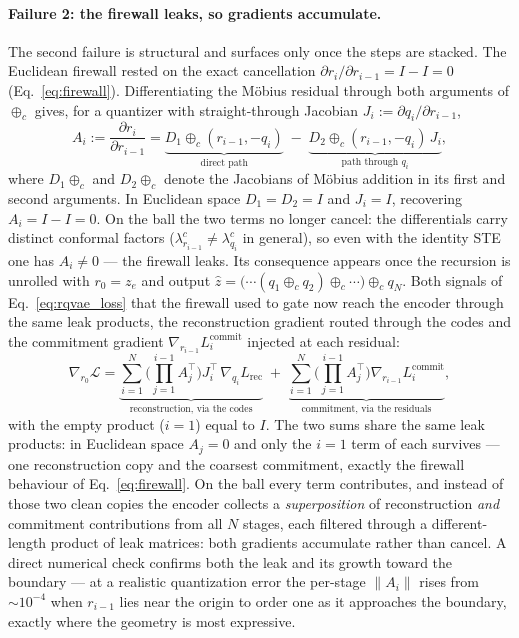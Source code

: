 \documentclass[12pt]{report}
\begin{document}
\paragraph{Failure 2: the firewall leaks, so gradients accumulate.}
The second failure is structural and surfaces only once the steps are stacked. The Euclidean firewall rested on the exact cancellation $\partial r_i/\partial r_{i-1}=I-I=0$ (Eq.~\ref{eq:firewall}). Differentiating the M\"obius residual through both arguments of $\oplus_c$ gives, for a quantizer with straight-through Jacobian $J_i := \partial q_i/\partial r_{i-1}$,
\begin{equation}
    \label{eq:leak}
    A_i := \frac{\partial r_i}{\partial r_{i-1}}
    = \underbrace{D_1\!\oplus_c(r_{i-1}, -q_i)}_{\text{direct path}}
    \;-\; \underbrace{D_2\!\oplus_c(r_{i-1}, -q_i)\, J_i}_{\text{path through }q_i},
\end{equation}
where $D_1\!\oplus_c$ and $D_2\!\oplus_c$ denote the Jacobians of M\"obius addition in its first and second arguments. In Euclidean space $D_1=D_2=I$ and $J_i=I$, recovering $A_i=I-I=0$. On the ball the two terms no longer cancel: the differentials carry distinct conformal factors ($\lambda^c_{r_{i-1}}\neq\lambda^c_{q_i}$ in general), so even with the identity STE one has $A_i\neq 0$ --- the firewall leaks. Its consequence appears once the recursion is unrolled with $r_0=z_e$ and output $\hat z = \big(\cdots(q_1\oplus_c q_2)\oplus_c\cdots\big)\oplus_c q_N$. Both signals of Eq.~\ref{eq:rqvae_loss} that the firewall used to gate now reach the encoder through the same leak products, the reconstruction gradient routed through the codes and the commitment gradient $\nabla_{r_{i-1}} L^{\text{commit}}_i$ injected at each residual:
\begin{equation}
    \label{eq:stack}
    \nabla_{r_0}\mathcal{L}
    = \underbrace{\sum_{i=1}^{N}\Big(\textstyle\prod_{j=1}^{i-1} A_j^{\top}\Big)
    J_i^{\top}\,\nabla_{q_i} L_{\text{rec}}}_{\text{reconstruction, via the codes}}
    \;+\; \underbrace{\sum_{i=1}^{N}\Big(\textstyle\prod_{j=1}^{i-1} A_j^{\top}\Big)
    \nabla_{r_{i-1}} L^{\text{commit}}_i}_{\text{commitment, via the residuals}},
\end{equation}
with the empty product ($i=1$) equal to $I$. The two sums share the same leak products: in Euclidean space $A_j=0$ and only the $i=1$ term of each survives --- one reconstruction copy and the coarsest commitment, exactly the firewall behaviour of Eq.~\ref{eq:firewall}. On the ball every term contributes, and instead of those two clean copies the encoder collects a \emph{superposition} of reconstruction \emph{and} commitment contributions from all $N$ stages, each filtered through a different-length product of leak matrices: both gradients accumulate rather than cancel. A direct numerical check confirms both the leak and its growth toward the boundary --- at a realistic quantization error the per-stage $\|A_i\|$ rises from $\sim\!10^{-4}$ when $r_{i-1}$ lies near the origin to order one as it approaches the boundary, exactly where the geometry is most expressive.
\end{document}

